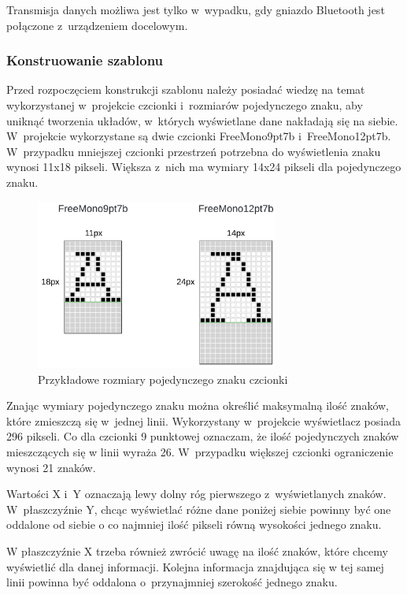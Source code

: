 \documentclass[a4paper,12pt, twoside]{article}
\begin{document}
    	Transmisja danych możliwa jest tylko w~wypadku, gdy gniazdo Bluetooth jest połączone z~urządzeniem docelowym.
	
    	\subsubsection{Konstruowanie szablonu}
    	Przed rozpoczęciem konstrukcji szablonu należy posiadać wiedzę na temat wykorzystanej w~projekcie czcionki i~rozmiarów pojedynczego znaku, aby uniknąć tworzenia układów, w~których wyświetlane dane nakładają się na siebie. W~projekcie wykorzystane są dwie czcionki FreeMono9pt7b i~FreeMono12pt7b. W~przypadku mniejszej czcionki przestrzeń potrzebna do wyświetlenia znaku wynosi 11x18 pikseli. Większa z~nich ma wymiary 14x24 pikseli dla pojedynczego znaku.
    	\begin{figure}[H]
    	        \centering
    			\includegraphics[width=8cm]{images/rozmiarczcionek.png}
    			\caption{Przykładowe rozmiary pojedynczego znaku czcionki}
                \label{fig:font}
    	\end{figure}
    	
    	Znając wymiary pojedynczego znaku można określić maksymalną ilość znaków, które zmieszczą się w~jednej linii. Wykorzystany w~projekcie wyświetlacz posiada 296 pikseli. Co dla czcionki 9 punktowej oznaczam, że ilość pojedynczych znaków mieszczących się w linii wyraża 26. W~przypadku większej czcionki ograniczenie wynosi 21 znaków.
    	
    	Wartości X i~Y oznaczają lewy dolny róg pierwszego z~wyświetlanych znaków. W~płaszczyźnie Y, chcąc wyświetlać różne dane poniżej siebie powinny być one oddalone od siebie o co najmniej ilość pikseli równą wysokości jednego znaku.
    	
    	W płaszczyźnie X trzeba również zwrócić uwagę na ilość znaków, które chcemy wyświetlić dla danej informacji. Kolejna informacja znajdująca się w tej samej linii powinna być oddalona o~przynajmniej szerokość jednego znaku.
    	
\end{document}
